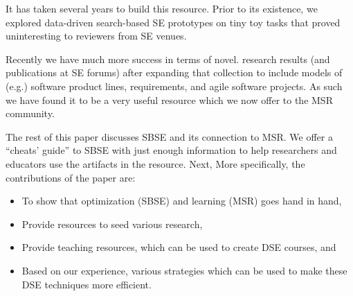 \documentclass[table, xcdraw, sigconf,review, anonymous]{acmart}
\begin{document}
It has    taken several years to build this resource. Prior to its
existence, we explored  data-driven search-based SE
prototypes on tiny toy tasks that proved 
uninteresting to 
 reviewers from SE venues. 

Recently we have much more success in terms of novel.
research results
(and publications at SE forums) after 
expanding that collection
to include models
of (e.g.) software product lines, requirements, and
agile software projects. 
As such we have found it to be a very useful resource
which we now offer to the MSR community.








The rest of this paper discusses SBSE and its connection to MSR. 
We offer a ``cheats' guide'' to SBSE with just enough information to help researchers and educators use the artifacts in the resource. Next,  More specifically, the contributions of the paper are:
\begin{itemize}
    \item To show that optimization (SBSE) and learning (MSR) goes hand in hand,
    \item Provide resources to seed various research,
    \item Provide teaching resources, which can be used to create DSE courses, and
    \item Based on our experience, various strategies which can be used to make these DSE techniques more efficient.
\end{itemize}
\end{document}
